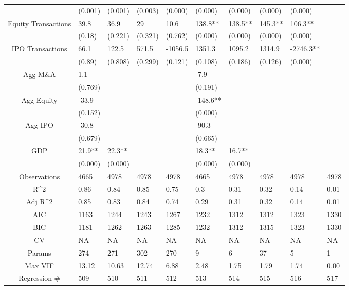 \documentclass{article}
\begin{document}
\begin{table}[H]
\begin{tabular}{|clllllllll|}
   & (0.001) & (0.001) & (0.003) & (0.000) & (0.000) & (0.000) & (0.000) & (0.000) &  \\ 
  Equity Transactions & 39.8 & 36.9 & 29 & 10.6 & 138.8** & 138.5** & 145.3** & 106.3** &  \\ 
   & (0.18) & (0.221) & (0.321) & (0.762) & (0.000) & (0.000) & (0.000) & (0.000) &  \\ 
  IPO Transactions & 66.1 & 122.5 & 571.5 & -1056.5 & 1351.3 & 1095.2 & 1314.9 & -2746.3** &  \\ 
   & (0.89) & (0.808) & (0.299) & (0.121) & (0.108) & (0.186) & (0.126) & (0.000) &  \\ 
  Agg M\&A & 1.1 &  &  &  & -7.9 &  &  &  &  \\ 
   & (0.769) &  &  &  & (0.191) &  &  &  &  \\ 
  Agg Equity & -33.9 &  &  &  & -148.6** &  &  &  &  \\ 
   & (0.152) &  &  &  & (0.000) &  &  &  &  \\ 
  Agg IPO & -30.8 &  &  &  & -90.3 &  &  &  &  \\ 
   & (0.679) &  &  &  & (0.665) &  &  &  &  \\ 
  GDP & 21.9** & 22.3** &  &  & 18.3** & 16.7** &  &  &  \\ 
   & (0.000) & (0.000) &  &  & (0.000) & (0.000) &  &  &  \\ 
  \hline 
 Observations & 4665 & 4978 & 4978 & 4978 & 4665 & 4978 & 4978 & 4978 & 4978 \\ 
  R^2 & 0.86 & 0.84 & 0.85 & 0.75 & 0.3 & 0.31 & 0.32 & 0.14 & 0.01 \\ 
  Adj R^2 & 0.85 & 0.83 & 0.84 & 0.74 & 0.29 & 0.31 & 0.32 & 0.14 & 0.01 \\ 
  AIC & 1163 & 1244 & 1243 & 1267 & 1232 & 1312 & 1312 & 1323 & 1330 \\ 
  BIC & 1181 & 1262 & 1263 & 1285 & 1232 & 1312 & 1315 & 1323 & 1330 \\ 
  CV & NA & NA & NA & NA & NA & NA & NA & NA & NA \\ 
  Params & 274 & 271 & 302 & 270 & 9 & 6 & 37 & 5 & 1 \\ 
  Max VIF & 13.12 & 10.63 & 12.74 & 6.88 & 2.48 & 1.75 & 1.79 & 1.74 & 0.00 \\ 
  Regression \# & 509 & 510 & 511 & 512 & 513 & 514 & 515 & 516 & 517 \\ 
   \hline
\end{tabular}
 
\end{table}
\end{document}
